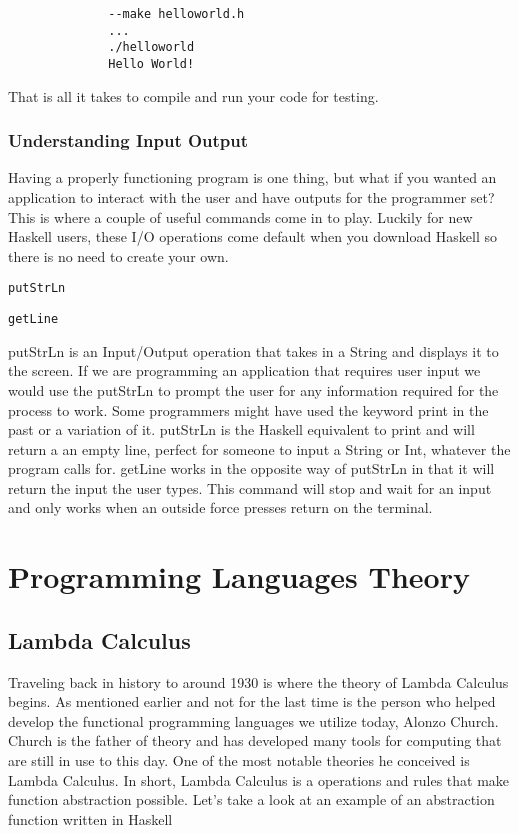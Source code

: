 \documentclass{article}
\begin{document}
    \begin{lstlisting}
              --make helloworld.h
              ...
              ./helloworld
              Hello World!
    \end{lstlisting}
    
    \noindent That is all it takes to compile and run your code for testing.
    
    \medskip
    \subsubsection{Understanding Input Output}
    Having a properly functioning program is one thing, but what if you wanted an application to interact with the user and have outputs for the programmer set? This is where a couple of useful commands come in to play. Luckily for new Haskell users, these I/O operations come default when you download Haskell so there is no need to create your own.  
    
    \lstinline{putStrLn}
    
    \smallskip
    \lstinline{getLine}
    
    putStrLn is an Input/Output operation that takes in a String and displays it to the screen. If we are programming an application that requires user input we would use the putStrLn to prompt the user for any information required for the process to work. Some programmers might have used the keyword print in the past or a variation of it. putStrLn is the Haskell equivalent to print and will return a an empty line, perfect for someone to input a String or Int, whatever the program calls for. getLine works in the opposite way of putStrLn in that it will return the input the user types. This command will stop and wait for an input and only works when an outside force presses return on the terminal.

\section{Programming Languages Theory}
    \subsection{Lambda Calculus}
    Traveling back in history to around 1930 is where the theory of Lambda Calculus begins. As mentioned earlier and not for the last time is the person who helped develop the functional programming languages we utilize today, Alonzo Church. Church is the father of theory and has developed many tools for computing that are still in use to this day. One of the most notable theories he conceived is Lambda Calculus. In short, Lambda Calculus is a operations and rules that make function abstraction possible. Let's take a look at an example of an abstraction function written in Haskell
    
\end{document}
